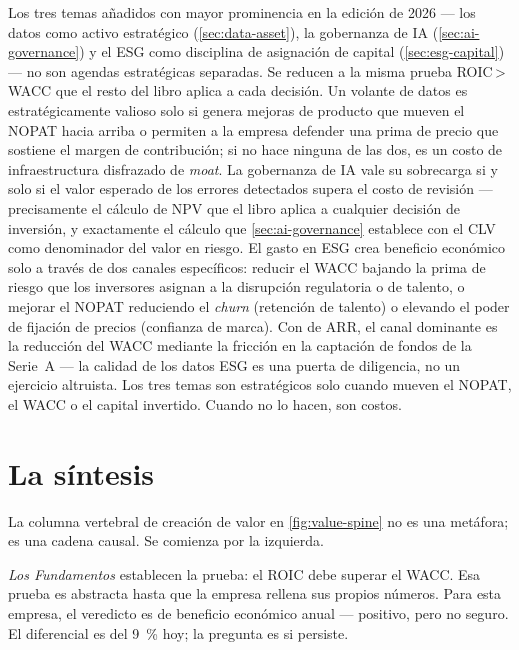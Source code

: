 Los tres temas añadidos con mayor prominencia en la edición de 2026 --- los datos como activo
estratégico (\cref{sec:data-asset}), la gobernanza de IA (\cref{sec:ai-governance}) y el ESG
como disciplina de asignación de capital (\cref{sec:esg-capital}) --- no son agendas estratégicas
separadas. Se reducen a la misma prueba ROIC\,>\,WACC que el resto del libro aplica a cada
decisión. Un volante de datos es estratégicamente valioso solo si genera mejoras de producto que
mueven el NOPAT hacia arriba o permiten a la empresa defender una prima de precio que sostiene el
margen de contribución; si no hace ninguna de las dos, es un costo de infraestructura disfrazado
de \emph{moat}. La gobernanza de IA vale su sobrecarga si y solo si el valor esperado de los
errores detectados supera el costo de revisión --- precisamente el cálculo de NPV que el libro
aplica a cualquier decisión de inversión, y exactamente el cálculo que \cref{sec:ai-governance}
establece con el CLV como denominador del valor en riesgo. El gasto en ESG crea beneficio
económico solo a través de dos canales específicos: reducir el WACC bajando la prima de riesgo
que los inversores asignan a la disrupción regulatoria o de talento, o mejorar el NOPAT
reduciendo el \emph{churn} (retención de talento) o elevando el poder de fijación de precios
(confianza de marca). Con  de ARR, el canal dominante es la reducción del WACC
mediante la fricción en la captación de fondos de la Serie~A --- la calidad de los datos ESG es
una puerta de diligencia, no un ejercicio altruista. Los tres temas son estratégicos solo cuando
mueven el NOPAT, el WACC o el capital invertido. Cuando no lo hacen, son costos.

\section{La síntesis}\label{sec:capstone-synthesis}

La columna vertebral de creación de valor en \cref{fig:value-spine} no es una metáfora; es una
cadena causal. Se comienza por la izquierda.

\emph{Los Fundamentos} establecen la prueba: el ROIC debe superar el WACC. Esa prueba es
abstracta hasta que la empresa rellena sus propios números. Para esta empresa, el veredicto es
 de beneficio económico anual --- positivo, pero no seguro. El diferencial es del
\qty{9}{\percent} hoy; la pregunta es si persiste.

